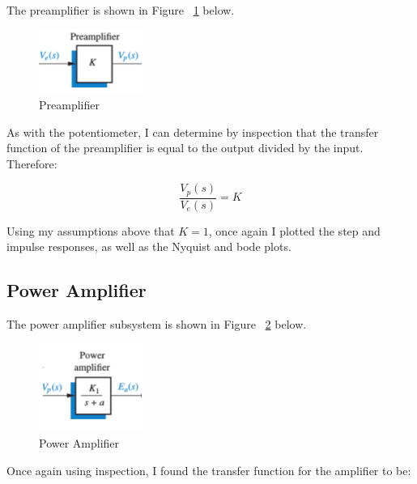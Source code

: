 \documentclass[12pt]{article}
\begin{document}
The preamplifier is shown in Figure ~\ref{fig:preamp} below.

\begin{figure}[H]
\begin{center}
	\includegraphics[width=0.3\textwidth]{./img/PreamplifierBlock.png}
	\caption{\label{fig:preamp}Preamplifier}
\end{center}
\end{figure}

As with the potentiometer, I can determine by inspection that the transfer function of the preamplifier is equal to the output divided by the input. Therefore:

\begin{equation}
\frac{V_{p}(s)}{V_{e}(s)} = K\label{eq:2}
\end{equation}

Using my assumptions above that $K = 1$, once again I plotted the step and impulse responses, as well as the Nyquist and bode plots.


\subsection{Power Amplifier}

The power amplifier subsystem is shown in Figure ~\ref{fig:amp} below.

\begin{figure}[H]
\begin{center}
	\includegraphics[width=0.3\textwidth]{./img/PowerAmplifierBlock.png}
	\caption{\label{fig:amp}Power Amplifier}
\end{center}
\end{figure}

Once again using inspection, I found the transfer function for the amplifier to be:
\end{document}
